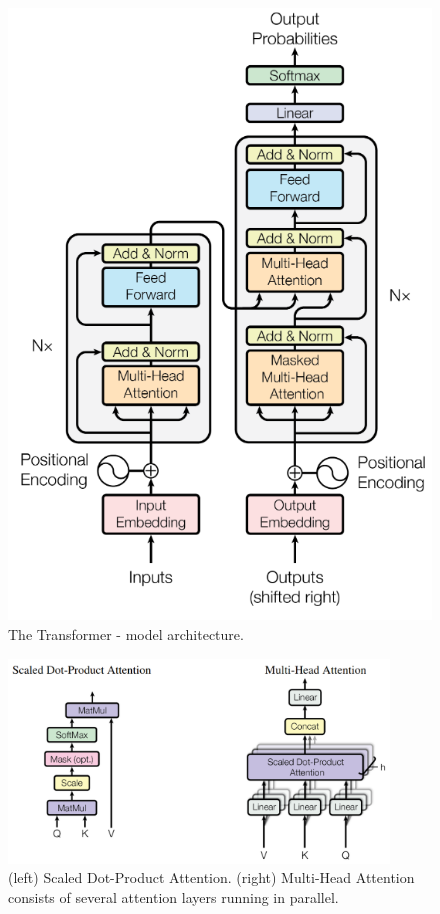 \begin{figure}[!ht]
\centering
\includegraphics[scale=0.6]{figuras/transformer_arquitetura.png}
\caption{The Transformer - model architecture. \citep{attention_is_all_you_need}}
\label{trans_arq}
\end{figure}


\begin{figure}[!ht]
\centering
\includegraphics[width=0.9\textwidth]{figuras/self-att.png}
\caption{(left) Scaled Dot-Product Attention. (right) Multi-Head Attention consists of several
attention layers running in parallel. \citep{attention_is_all_you_need}}
\label{self-att}
\end{figure}

